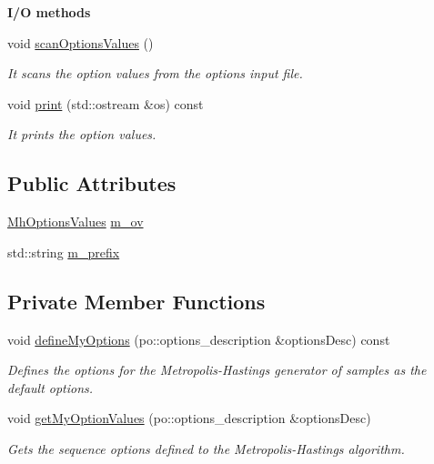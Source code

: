 \begin{Indent}{\bf I/\-O methods}\par
\begin{DoxyCompactItemize}
\item 
void \hyperlink{class_q_u_e_s_o_1_1_metropolis_hastings_s_g_options_a51455fb28b064d5dc2cc114c8448021b}{scan\-Options\-Values} ()
\begin{DoxyCompactList}\small\item\em It scans the option values from the options input file. \end{DoxyCompactList}\item 
void \hyperlink{class_q_u_e_s_o_1_1_metropolis_hastings_s_g_options_a61139044eab2b51b7b84c3cc823d74fe}{print} (std\-::ostream \&os) const 
\begin{DoxyCompactList}\small\item\em It prints the option values. \end{DoxyCompactList}\end{DoxyCompactItemize}
\end{Indent}
\subsection*{Public Attributes}
\begin{DoxyCompactItemize}
\item 
\hyperlink{class_q_u_e_s_o_1_1_mh_options_values}{Mh\-Options\-Values} \hyperlink{class_q_u_e_s_o_1_1_metropolis_hastings_s_g_options_a9d4792d9fc2dc5439b8ab489b0c236eb}{m\-\_\-ov}
\item 
std\-::string \hyperlink{class_q_u_e_s_o_1_1_metropolis_hastings_s_g_options_a4f7c510aaa530336d24259e2a89f5d0b}{m\-\_\-prefix}
\end{DoxyCompactItemize}
\subsection*{Private Member Functions}
\begin{DoxyCompactItemize}
\item 
void \hyperlink{class_q_u_e_s_o_1_1_metropolis_hastings_s_g_options_a96acf9bcc970ab7498497f7b9b1d071e}{define\-My\-Options} (po\-::options\-\_\-description \&options\-Desc) const 
\begin{DoxyCompactList}\small\item\em Defines the options for the Metropolis-\/\-Hastings generator of samples as the default options. \end{DoxyCompactList}\item 
void \hyperlink{class_q_u_e_s_o_1_1_metropolis_hastings_s_g_options_a688f8e29da087db7e461f5d9ada98371}{get\-My\-Option\-Values} (po\-::options\-\_\-description \&options\-Desc)
\begin{DoxyCompactList}\small\item\em Gets the sequence options defined to the Metropolis-\/\-Hastings algorithm. \end{DoxyCompactList}\end{DoxyCompactItemize}
